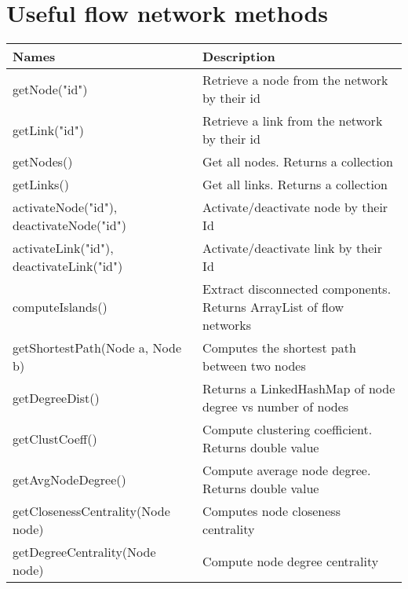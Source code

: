 \documentclass[11pt,fleqn]{book} %
\begin{document}
\section{Useful flow network methods}\label{sec:net_methods}
\begin{table}[!ht]
\centering
\begin{tabular}{| p{7cm} | p{9cm} |}
\hline
\rowcolor{Gray}
Names & Description \\
\hline
getNode({"id"}) & Retrieve a node from the network by their id \\
\hline
getLink("id") & Retrieve a link from the network by their id \\
\hline
getNodes() & Get all nodes. Returns a collection \\
\hline
getLinks() & Get all links. Returns a collection \\
\hline
activateNode("id"), deactivateNode("id") & Activate/deactivate node by their Id \\
\hline
activateLink("id"), deactivateLink("id") & Activate/deactivate link by their Id \\
\hline
computeIslands() & Extract disconnected components. Returns ArrayList of flow networks \\
\hline
getShortestPath(Node a, Node b) & Computes the shortest path between two nodes \\
\hline
getDegreeDist() & Returns a LinkedHashMap of node degree vs number of nodes \\
\hline
getClustCoeff() & Compute clustering coefficient. Returns double value \\
\hline
getAvgNodeDegree() & Compute average node degree. Returns double value \\
\hline
getClosenessCentrality(Node node) & Computes node closeness centrality \\
\hline
getDegreeCentrality(Node node) & Compute node degree centrality \\
\hline
\end{tabular}
\end{table}
\end{document}
